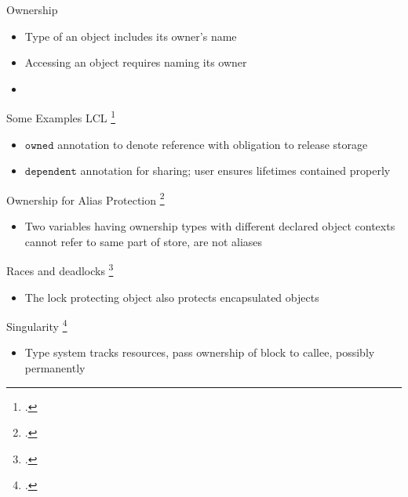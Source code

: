 \documentclass[aspectratio=169]{beamer}
\begin{document}
\begin{frame}{Ownership}
    \begin{itemize}
      \item Type of an object includes its owner's name
      \item Accessing an object requires naming its owner
      \item {}
    \end{itemize}
\end{frame}

\begin{frame}{Some Examples}
\footnotesize
  LCL \footcite{evans_static_1996}
    \vspace{-0.1in}
    \begin{itemize}
        \item $\texttt{owned}$ annotation to denote reference with obligation to release storage
        \item $\texttt{dependent}$ annotation for sharing; user ensures lifetimes contained properly %
    \end{itemize}
  Ownership for Alias Protection \footcite{clarke_ownership_1998}
    \vspace{-0.1in}
    \begin{itemize}
      \item Two variables having ownership types with different declared object contexts cannot refer to same part of store, are not aliases
    \end{itemize}
  Races and deadlocks \footcite{boyapati_ownership_2002}
    \vspace{-0.1in}
    \begin{itemize}
      \item The lock protecting object also protects encapsulated objects
    \end{itemize}
  Singularity \footcite{fahndrich_language_2006}
    \vspace{-0.1in}
    \begin{itemize}
        \item Type system tracks resources, pass ownership of block to callee, possibly permanently
    \end{itemize}
  \vspace{0.1in}
\end{frame}
\end{document}
